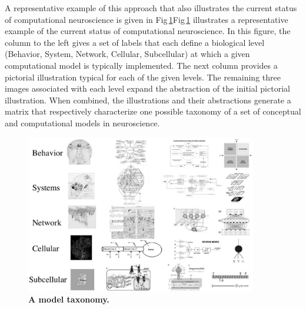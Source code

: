 \documentclass[10pt,letterpaper]{article}
\begin{document}

A representative example of this approach that also illustrates the current status of computational neuroscience is given in Fig\,\ref{fig1}Fig\,\ref{fig1} illustrates a representative example of the current status of computational neuroscience. In this figure, the column to the left gives a set of labels that each define a biological level (Behavior, System, Network, Cellular, Subcellular) at which a given computational model is typically implemented. The next column provides a pictorial illustration typical for each of the given levels. The remaining three images associated with each level expand the abstraction of the initial pictorial illustration. When combined, the illustrations and their abstractions generate a matrix that respectively characterize one possible taxonomy of a set of conceptual and computational models in neuroscience.

\begin{figure}[h!t]
  \begin{center}
    \includegraphics[width=0.9\textwidth]{figures/fig1-bw.png} %
  \end{center}
  \caption{ \small{\bf A model taxonomy.} }
  \label{fig1}
\end{figure}
\end{document}
